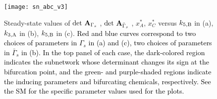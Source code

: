 \documentclass[ amsmath,amssymb,nofootinbib
]{revtex4-1}
\newcommand{\detA}{{\rm det}\,  {\bf A}}
\newcommand{\gs}{{\Gamma_s}}
\newcommand{\gbs}{{\bar{\Gamma}_s}}
\newcommand{\corr}[1]{\textcolor{black}{#1}}
\begin{document}
%
%



\begin{figure}[t]
\hspace{-0.2cm}
\texttt{[image: sn\_abc\_v3]}
\caption{{Steady-state values of $\det\, {\bf A}_{{\Gamma}_s}$ , $\det\, {\bf A}_{\bar{\Gamma}_s}$ , $x_A^*$, $x_C^*$ versus  $k_{5,{\rm B}}$ in (a), $k_{3,\rm A}$ in (b),  $k_{5,{\rm B}}$ in (c). }
\corr{Red and blue curves correspond to two choices of  parameters in $\gs$ in (a) and (c), two choices of parameters in $\gbs$  in (b).
In  the top panel of each case, the dark-colored region indicates the subnetwork whose determinant changes its sign  at the bifurcation point, and the  green- and purple-shaded regions indicate the inducing parameters and  bifurcating chemicals, respectively. 
See the SM for the specific parameter values used for the plots. }
} 
\label{fig:sn}
\end{figure}
\end{document}
